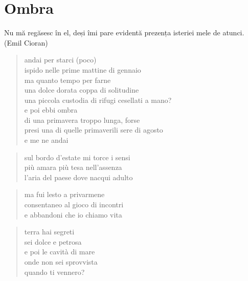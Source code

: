 \chapter*{Ombra}

\begin{otherlanguage}{romanian}
    Nu mă regăsesc în el, deşi îmi pare evidentă prezenţa isteriei mele de atunci. (Emil Cioran)
\end{otherlanguage}


\begin{verse}
    andai per starci (poco)\\
    ispido nelle prime mattine di gennaio\\
    ma quanto tempo per farne\\
    una dolce dorata coppa di solitudine\\
    una piccola custodia di rifugi cesellati a mano?\\
    e poi ebbi ombra\\
    di una primavera troppo lunga, forse\\
    presi una di quelle primaverili sere di agosto\\
    e me ne andai
\end{verse}

\clearpage


\begin{verse}
    sul bordo d'estate mi torce i sensi\\
    più amara più tesa nell'assenza\\
    l'aria del paese dove nacqui adulto
\end{verse}

\begin{verse}
    ma fui lesto a privarmene\\
    consentaneo al gioco di incontri\\
    e abbandoni che io chiamo vita
\end{verse}

\clearpage


\begin{verse}
    terra hai segreti\\
    sei dolce e petrosa\\
    e poi le cavità di mare\\
    onde non sei sprovvista\\
    quando ti vennero?
\end{verse}

